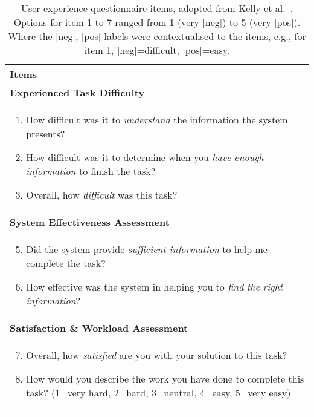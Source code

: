 \documentclass[sigconf]{acmart}
\begin{document}
\begin{table}[t]
	\centering
	\small
	\caption{User experience questionnaire items, adopted from Kelly et al.~\citep{Kelly2015}. Options for item 1 to 7 ranged from 1 (very [neg]) to 5 (very [pos]). Where the [neg], [pos] labels were contextualised to the items, e.g., for item 1, [neg]=difficult, [pos]=easy.} \label{table: user experience questionnaire}
	\vspace{-10pt}
	\begin{tabular}{p{8cm}}
		\toprule 
		\textbf{Items}  \\
		\toprule
		\textbf{Experienced Task Difficulty} \\
		\begin{enumerate}[leftmargin=*,  topsep=0pt, labelsep=1pt]
			\item How difficult was it to \textit{understand} the information the system presents?
			\item How difficult was it to determine when you \textit{have enough information} to finish the task?				  
			\item Overall, how \textit{difficult} was this task?
		\end{enumerate} \\
		
		\midrule
		\textbf{System Effectiveness Assessment} \\
		\begin{enumerate}[leftmargin=*,  topsep=0pt, labelsep=1pt]
			\setcounter{enumi}{4}
			\item Did the system provide \textit{sufficient information} to help me complete the task?
			\item How effective was the system in helping you to \textit{find the right information}?
		\end{enumerate} \\
		
		\midrule
		\textbf{Satisfaction \& Workload Assessment} \\
		\begin{enumerate}[leftmargin=*,  topsep=0pt, labelsep=1pt]
			\setcounter{enumi}{6}
			\item Overall, how \textit{satisfied} are you with your solution to this task?
			\item How would you describe the work you have done to complete this task? (1=very hard, 2=hard, 3=neutral, 4=easy, 5=very easy)
		\end{enumerate} \\
		\bottomrule%
	\end{tabular} 
\end{table}
\end{document}

